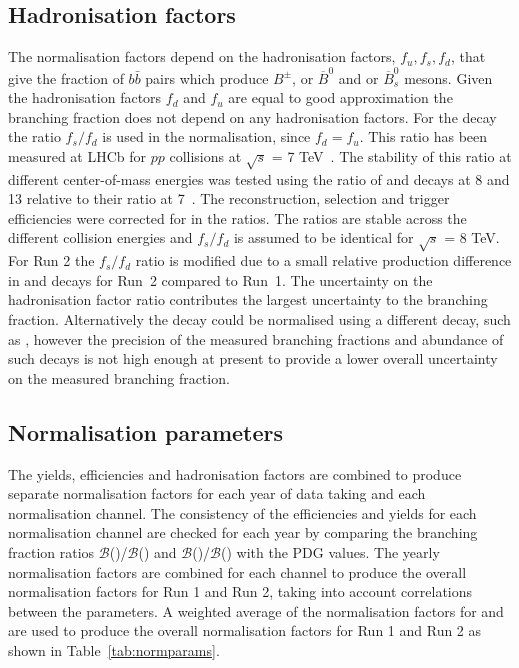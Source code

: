 {\subsection{Hadronisation factors}

The normalisation factors depend on the hadronisation factors, $f_{u}, f_{s}, f_{d}$, that give the fraction of $b\bar{b}$ pairs which produce $B^{\pm}$, \bd or $\overline{B}^{0}$ and \bs or $\overline{B}^{0}_{s}$ mesons. %
Given the hadronisation factors $f_{d}$ and $f_{u}$ are equal to good approximation the \bdmumu branching fraction does not depend on any hadronisation factors. For the \bsmumu decay the ratio $f_{s}/f_{d}$ is used in the normalisation, since $f_{d} = f_{u}$. This ratio has been measured at LHCb for $pp$ collisions at $\sqrt{s}$ = 7 TeV~\cite{LHCb-CONF-2013-011}. The stability of this ratio at different center-of-mass energies was tested using the ratio of \bsjpsiphi and \bujpisk decays at 8 and 13 \tev relative to their ratio at 7~\tev. The reconstruction, selection and trigger efficiencies were corrected for in the ratios. 
The ratios are stable across the different collision energies and $f_{s}/f_{d}$ is assumed to be identical for $\sqrt{s}$ = 8 TeV. For Run 2 the $f_{s}/f_{d}$ ratio is modified due to a small relative production difference in \bsjpsiphi and \bujpisk decays for Run~2 compared to Run~1. 
The uncertainty on the hadronisation factor ratio contributes the largest uncertainty to the \bsmumu branching fraction. Alternatively the \bsmumu decay could be normalised using a different \bs decay, such as \bsjpsiphi, however the precision of the measured branching fractions and abundance of such decays is not high enough at present to provide a lower overall uncertainty on the measured branching fraction.

\subsection{Normalisation parameters}

The yields, efficiencies and hadronisation factors are combined to produce separate normalisation factors for each year of data taking and each normalisation channel. The consistency of the efficiencies and yields for each normalisation channel are checked for each year by comparing the branching fraction ratios $\mathcal{B}$(\bdkpi)/$\mathcal{B}$(\bujpsik) and $\mathcal{B}$(\bujpsik)/$\mathcal{B}$(\bsjpsiphi) with the PDG values. The yearly normalisation factors are combined for each channel to produce the overall normalisation factors for Run 1 and Run 2, taking into account correlations between the parameters. A weighted average of the normalisation factors for \bdkpi and \bujpsik are used to produce the overall normalisation factors for Run 1 and Run 2 as shown in Table~\ref{tab:normparams}.

}
